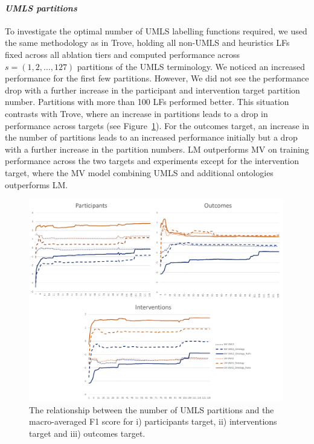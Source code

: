 \documentclass[10.7pt,]{article}
\let\oldparagraph\paragraph
\renewcommand{\paragraph}[1]{\oldparagraph{#1}\mbox{}}
\begin{document}
\paragraph{\textit{UMLS partitions}}
To investigate the optimal number of UMLS labelling functions required, we used the same methodology as in Trove, holding all non-UMLS and heuristics LFs fixed across all ablation tiers and computed performance across $s = ( 1, 2, \dotso , 127 )$ partitions of the UMLS terminology.
We noticed an increased performance for the first few partitions. However, We did not see the performance drop with a further increase in the participant and intervention target partition number.
Partitions with more than 100 LFs performed better.
This situation contrasts with Trove, where an increase in partitions leads to a drop in performance across targets (see Figure~\ref{fig:partitions}).
For the outcomes target, an increase in the number of partitions leads to an increased performance initially but a drop with a further increase in the partition numbers.
LM outperforms MV on training performance across the two targets and experiments except for the intervention target, where the MV model combining UMLS and additional ontologies outperforms LM.
%
\begin{figure}[ht]
    \centering
    \includegraphics[width=0.99\textwidth]{figures/partitions.pdf}
    \caption{The relationship between the number of UMLS partitions and the macro-averaged F1 score for i) participants target, ii) interventions target and iii) outcomes target.}
    \label{fig:partitions}
\end{figure}
%
\end{document}
